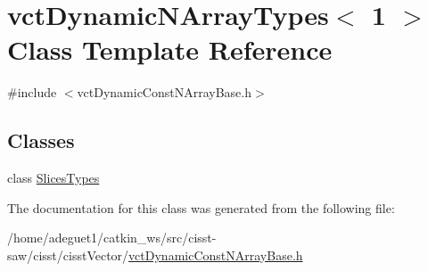 \hypertarget{classvct_dynamic_n_array_types_3_011_01_4}{\section{vct\-Dynamic\-N\-Array\-Types$<$ 1 $>$ Class Template Reference}
\label{classvct_dynamic_n_array_types_3_011_01_4}
}


{\ttfamily \#include $<$vct\-Dynamic\-Const\-N\-Array\-Base.\-h$>$}

\subsection*{Classes}
\begin{DoxyCompactItemize}
\item 
class \hyperlink{classvct_dynamic_n_array_types_3_011_01_4_1_1_slices_types}{Slices\-Types}
\end{DoxyCompactItemize}


The documentation for this class was generated from the following file\-:\begin{DoxyCompactItemize}
\item 
/home/adeguet1/catkin\-\_\-ws/src/cisst-\/saw/cisst/cisst\-Vector/\hyperlink{vct_dynamic_const_n_array_base_8h}{vct\-Dynamic\-Const\-N\-Array\-Base.\-h}\end{DoxyCompactItemize}
